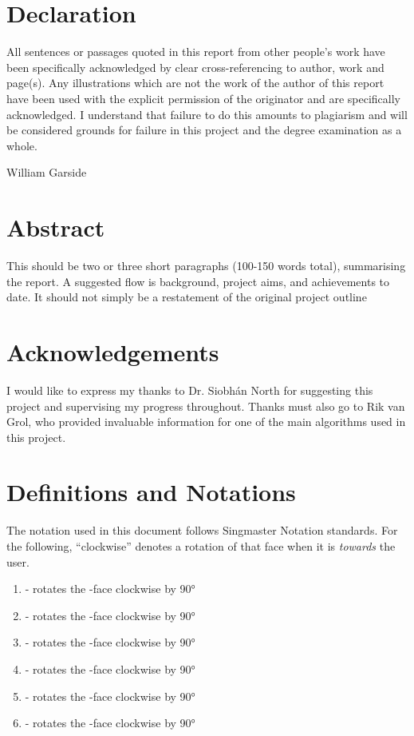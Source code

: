 \documentclass{report}
\newcommand{\tit}[1]{\textit{#1}}
\newcommand{\movegroup}[1]{\uppercase{\texttt{\formatmoves{#1}}}}
\newcommand{\face}[1]{\uppercase{\texttt{\formatmovesnospace{#1}}}-face}
\begin{document}
	
	\newpage
	
	\renewcommand{\thechapter}{\Roman{chapter}}
	\chapter{Declaration}
	All sentences or passages quoted in this report from other people's work have been specifically acknowledged by clear cross-referencing to author, work and page(s). Any illustrations which are not the work of the author of this report have been used with the explicit permission of the originator and are specifically acknowledged. I understand that failure to do this amounts to plagiarism and will be considered grounds for failure in this project and the degree examination as a whole.
	
	William Garside

	\newpage
	\chapter{Abstract}
	This should be two or three short paragraphs (100-150 words total), summarising the report. A suggested flow is background, project aims, and achievements to date. It should not simply be a restatement of the original project outline
	
	\newpage
	\chapter{Acknowledgements}
	I would like to express my thanks to Dr. Siobh\'{a}n North for suggesting this project and supervising my progress throughout. Thanks must also go to Rik van Grol, who provided invaluable information for one of the main algorithms used in this project.
	
	\newpage
	\chapter{Definitions and Notations}
	
	The notation used in this document follows Singmaster Notation standards. For the following, \enquote{clockwise} denotes a rotation of that face when it is \tit{towards} the user.
	
	\begin{enumerate}
		\item[] \movegroup{u} - rotates the \face{u} clockwise by \ang{90}
		\item[] \movegroup{d} - rotates the \face{d} clockwise by \ang{90}
		\item[] \movegroup{l} - rotates the \face{l} clockwise by \ang{90}
		\item[] \movegroup{r} - rotates the \face{r} clockwise by \ang{90}
		\item[] \movegroup{f} - rotates the \face{f} clockwise by \ang{90}
		\item[] \movegroup{b} - rotates the \face{b} clockwise by \ang{90}
	\end{enumerate}
	
\end{document}
